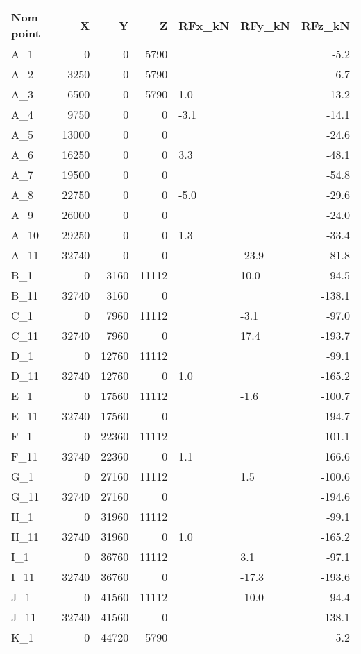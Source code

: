 \begin{tabular}{lrrrllr}
\toprule
Nom point & X & Y & Z & RFx\_kN & RFy\_kN & RFz\_kN \\
\midrule
A\_1 & 0 & 0 & 5790 &  &  & -5.2 \\
A\_2 & 3250 & 0 & 5790 &  &  & -6.7 \\
A\_3 & 6500 & 0 & 5790 & 1.0 &  & -13.2 \\
A\_4 & 9750 & 0 & 0 & -3.1 &  & -14.1 \\
A\_5 & 13000 & 0 & 0 &  &  & -24.6 \\
A\_6 & 16250 & 0 & 0 & 3.3 &  & -48.1 \\
A\_7 & 19500 & 0 & 0 &  &  & -54.8 \\
A\_8 & 22750 & 0 & 0 & -5.0 &  & -29.6 \\
A\_9 & 26000 & 0 & 0 &  &  & -24.0 \\
A\_10 & 29250 & 0 & 0 & 1.3 &  & -33.4 \\
A\_11 & 32740 & 0 & 0 &  & -23.9 & -81.8 \\
B\_1 & 0 & 3160 & 11112 &  & 10.0 & -94.5 \\
B\_11 & 32740 & 3160 & 0 &  &  & -138.1 \\
C\_1 & 0 & 7960 & 11112 &  & -3.1 & -97.0 \\
C\_11 & 32740 & 7960 & 0 &  & 17.4 & -193.7 \\
D\_1 & 0 & 12760 & 11112 &  &  & -99.1 \\
D\_11 & 32740 & 12760 & 0 & 1.0 &  & -165.2 \\
E\_1 & 0 & 17560 & 11112 &  & -1.6 & -100.7 \\
E\_11 & 32740 & 17560 & 0 &  &  & -194.7 \\
F\_1 & 0 & 22360 & 11112 &  &  & -101.1 \\
F\_11 & 32740 & 22360 & 0 & 1.1 &  & -166.6 \\
G\_1 & 0 & 27160 & 11112 &  & 1.5 & -100.6 \\
G\_11 & 32740 & 27160 & 0 &  &  & -194.6 \\
H\_1 & 0 & 31960 & 11112 &  &  & -99.1 \\
H\_11 & 32740 & 31960 & 0 & 1.0 &  & -165.2 \\
I\_1 & 0 & 36760 & 11112 &  & 3.1 & -97.1 \\
I\_11 & 32740 & 36760 & 0 &  & -17.3 & -193.6 \\
J\_1 & 0 & 41560 & 11112 &  & -10.0 & -94.4 \\
J\_11 & 32740 & 41560 & 0 &  &  & -138.1 \\
K\_1 & 0 & 44720 & 5790 &  &  & -5.2 \\

\end{tabular}
